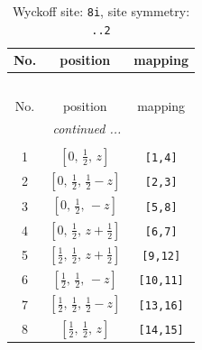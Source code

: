 \documentclass[fleqn,8pt]{jsarticle}
\begin{document}
\renewcommand{\arraystretch}{1.2}
\begin{longtable}{ccc}
\caption{Wyckoff site: {\tt 8i}, site symmetry: {\tt ..2}}
 \\
 \hline \hline
No. & position & mapping \\ \hline \endfirsthead

\multicolumn{2}{l}{\tablename\ \thetable{}} \\
 \hline \hline
No. & position & mapping \\ \hline \endhead

 \hline \hline
\multicolumn{2}{r}{\footnotesize\it continued ...} \\ \endfoot

 \hline \hline
\multicolumn{2}{r}{} \\ \endlastfoot

1 & $\left[ 0,\, \frac{1}{2},\, z \right]$ & {\tt [1,4]} \\ \hline
2 & $\left[ 0,\, \frac{1}{2},\, \frac{1}{2} - z \right]$ & {\tt [2,3]} \\ \hline
3 & $\left[ 0,\, \frac{1}{2},\, - z \right]$ & {\tt [5,8]} \\ \hline
4 & $\left[ 0,\, \frac{1}{2},\, z + \frac{1}{2} \right]$ & {\tt [6,7]} \\ \hline
5 & $\left[ \frac{1}{2},\, \frac{1}{2},\, z + \frac{1}{2} \right]$ & {\tt [9,12]} \\ \hline
6 & $\left[ \frac{1}{2},\, \frac{1}{2},\, - z \right]$ & {\tt [10,11]} \\ \hline
7 & $\left[ \frac{1}{2},\, \frac{1}{2},\, \frac{1}{2} - z \right]$ & {\tt [13,16]} \\ \hline
8 & $\left[ \frac{1}{2},\, \frac{1}{2},\, z \right]$ & {\tt [14,15]} \\
\end{longtable}
\renewcommand{\arraystretch}{1.2}
\end{document}
